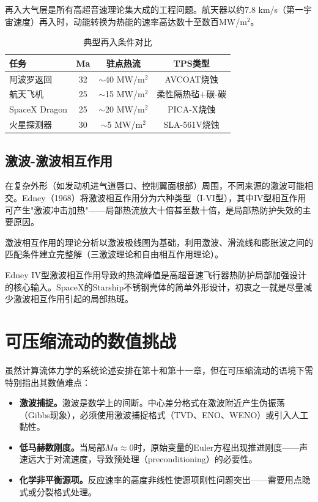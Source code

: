 再入大气层是所有高超音速理论集大成的工程问题。航天器以约7.8 km/s（第一宇宙速度）再入时，动能转换为热能的速率高达数十至数百MW/m$^{2}$。

\begin{table}[H]
\centering
\caption{典型再入条件对比}
\label{tab:reentry}
\begin{tabular}{lccc}
\toprule
\textbf{任务} & \textbf{Ma} & \textbf{驻点热流} & \textbf{TPS类型} \\
\midrule
阿波罗返回 & 32 & $\sim$40 MW/m$^{2}$ & AVCOAT烧蚀 \\
航天飞机 & 25 & $\sim$15 MW/m$^{2}$ & 柔性隔热毡+碳-碳 \\
SpaceX Dragon & 25 & $\sim$20 MW/m$^{2}$ & PICA-X烧蚀 \\
火星探测器 & 30 & $\sim$5 MW/m$^{2}$ & SLA-561V烧蚀 \\
\bottomrule
\end{tabular}
\end{table}

\subsection{激波-激波相互作用}

在复杂外形（如发动机进气道唇口、控制翼面根部）周围，不同来源的激波可能相交。Edney（1968）将激波相互作用分为六种类型（I-VI型），其中IV型相互作用可产生"激波冲击加热"——局部热流放大十倍甚至数十倍，是局部热防护失效的主要原因。

激波相互作用的理论分析以激波极线图为基础，利用激波、滑流线和膨胀波之间的匹配条件建立完整解（三激波理论和自由相互作用理论）。

\begin{remark}
Edney IV型激波相互作用导致的热流峰值是高超音速飞行器热防护局部加强设计的核心输入。SpaceX的Starship不锈钢壳体的简单外形设计，初衷之一就是尽量减少激波相互作用引起的局部热斑。
\end{remark}

\section{可压缩流动的数值挑战}

虽然计算流体力学的系统论述安排在第十和第十一章，但在可压缩流动的语境下需特别指出其数值难点：

\begin{itemize}
  \item \textbf{激波捕捉。}激波是数学上的间断。中心差分格式在激波附近产生伪振荡（Gibbs现象），必须使用激波捕捉格式（TVD、ENO、WENO）或引入人工黏性。
  \item \textbf{低马赫数刚度。}当局部$Ma\approx 0$时，原始变量的Euler方程出现推进刚度——声速远大于对流速度，导致预处理（preconditioning）的必要性。
  \item \textbf{化学非平衡源项。}反应速率的高度非线性使源项刚性问题突出——需要用点隐式或分裂格式处理。
\end{itemize}

